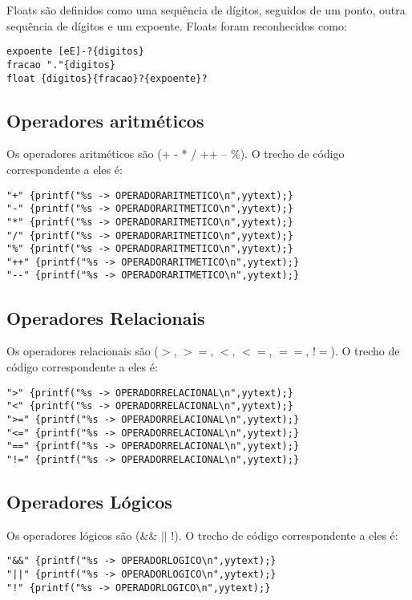 \documentclass[a4paper,10pt]{article}
\begin{document}
Floats são definidos como uma sequência de dígitos, seguidos de um ponto, outra sequência de dígitos e um expoente. Floats foram
reconhecidos como:
\begin{verbatim}
expoente [eE]-?{digitos} 
fracao "."{digitos}
float {digitos}{fracao}?{expoente}?
\end{verbatim}  


  \subsection{Operadores aritméticos}
  Os operadores aritméticos são (+  -  *  /  ++  -- \%). O trecho de código correspondente a eles é:
  \begin{verbatim}
"+" {printf("%s -> OPERADORARITMETICO\n",yytext);}
"-" {printf("%s -> OPERADORARITMETICO\n",yytext);}
"*" {printf("%s -> OPERADORARITMETICO\n",yytext);}
"/" {printf("%s -> OPERADORARITMETICO\n",yytext);}
"%" {printf("%s -> OPERADORARITMETICO\n",yytext);}
"++" {printf("%s -> OPERADORARITMETICO\n",yytext);}
"--" {printf("%s -> OPERADORARITMETICO\n",yytext);}
  \end{verbatim}


  \subsection{Operadores Relacionais}
  Os operadores relacionais são ($>$, $>=$, $<$, $<=$, $==$, $!=$). O trecho de código correspondente a eles é:
  \begin{verbatim}
">" {printf("%s -> OPERADORRELACIONAL\n",yytext);}
"<" {printf("%s -> OPERADORRELACIONAL\n",yytext);}
">=" {printf("%s -> OPERADORRELACIONAL\n",yytext);}
"<=" {printf("%s -> OPERADORRELACIONAL\n",yytext);}
"==" {printf("%s -> OPERADORRELACIONAL\n",yytext);}
"!=" {printf("%s -> OPERADORRELACIONAL\n",yytext);}
  \end{verbatim}

  \subsection{Operadores Lógicos}
  Os operadores lógicos são (\&\& $||$ !). O trecho de código correspondente a eles é:
  \begin{verbatim}
"&&" {printf("%s -> OPERADORLOGICO\n",yytext);}
"||" {printf("%s -> OPERADORLOGICO\n",yytext);}
"!" {printf("%s -> OPERADORLOGICO\n",yytext);}
  \end{verbatim}
\end{document}
